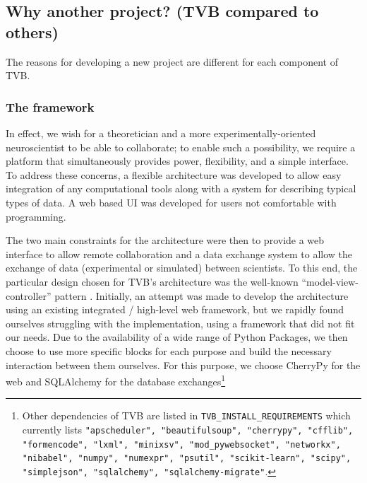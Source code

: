 
\subsection{Why another project? (TVB compared to others)}

The reasons for developing a new project are different for each component of
TVB.

\subsubsection{The framework}

In effect, we wish for a theoretician and a more experimentally-oriented
neuroscientist to be able to collaborate; to enable such a possibility, we
require a platform that simultaneously provides power, flexibility, and a 
simple interface.
To address these concerns, a flexible architecture was developed to
allow easy integration of any computational tools along with a system
for describing typical types of data. A web based UI was developed
for users not comfortable with programming.

The two main constraints for the architecture were then to provide a web
interface to allow remote collaboration and a data exchange system to allow the
exchange of data (experimental or simulated) between scientists. To this end,
the particular design chosen for TVB's architecture was the well-known
``model-view-controller'' pattern . Initially, an attempt 
was made to develop the architecture using an existing integrated / high-level web
framework, but we rapidly found ourselves struggling with the implementation, using
a framework that did not fit our needs. Due to the availability of a wide range of
Python Packages, we then choose to use more specific blocks for each purpose and
build the necessary interaction between them ourselves. For this purpose, we choose
\textsf{CherryPy} for the web  and \textsf{SQLAlchemy} for the database
exchanges\footnote{Other dependencies of TVB are listed in
    \texttt{TVB\_INSTALL\_REQUIREMENTS} which currently lists
    \texttt{"apscheduler", "beautifulsoup", "cherrypy", "cfflib", "formencode",
        "lxml", "minixsv", "mod\_pywebsocket", "networkx", "nibabel", "numpy",
        "numexpr", "psutil", "scikit-learn", "scipy", "simplejson",
        "sqlalchemy", "sqlalchemy-migrate"}.}

